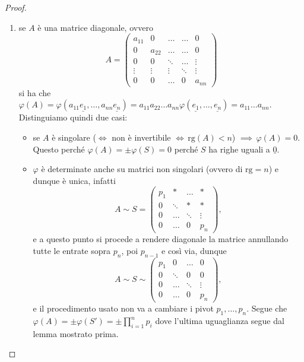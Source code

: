 \begin{proof}
\begin{enumerate}
        \item se $A$ è una matrice diagonale, ovvero
        $$
            A = \begin{pmatrix}
                a_{11} & 0 & \ldots & \ldots & 0 \\
                0 & a_{22} & \ldots & \ldots & 0 \\
                0 & 0 & \ddots & \ldots & \vdots \\
                \vdots & \vdots & \vdots & \ddots & \vdots \\
                0 & 0 & \ldots & 0 & a_{nn}
            \end{pmatrix}
        $$
        si ha che $\varphi(A) = \varphi(a_{11}\underline{e_1}, \ldots, a_{nn}\underline{e_n}) = a_{11} a_{22} \ldots a_{nn} \varphi(\underline{e_1}, \ldots, \underline{e_n}) = a_{11} \ldots a_{nn}.$
        Distinguiamo quindi due casi:
        \begin{itemize}
          \item se $A$ è singolare ($\iff$ non è invertibile $\iff \, \text{rg}(A) < n$) $\implies \, \varphi(A) = 0$. Questo perché $\varphi(A) = \pm \varphi(S) = 0$ perché $S$ ha righe uguali a $\underline{0}$.
          \item $\varphi$ è determinate anche su matrici non singolari (ovvero di $\text{rg} = n$) e dunque è unica, infatti
            $$A \sim S = \begin{pmatrix}
              p_1 & \ast & \ldots  & \ast \\
              0 & \ddots & \ast &  \ast \\
              0 & \ldots & \ddots & \vdots \\
              0 & \ldots & 0 & p_n
            \end{pmatrix},$$
            e a questo punto si procede a rendere diagonale la matrice annullando tutte le entrate sopra $p_n$, poi $p_{n-1}$ e così via, dunque
            $$
            A \sim S \sim \begin{pmatrix}
              p_1 & 0 & \ldots  & 0 \\
              0 & \ddots & 0 &  0 \\
              0 & \ldots & \ddots & \vdots \\
              0 & \ldots & 0 & p_n
            \end{pmatrix},
            $$
            e il procedimento usato non va a cambiare i pivot $p_1, \ldots, p_n$. Segue che $\varphi(A) = \pm \varphi(S') = \pm \prod\limits_{i=1}^n p_i$ dove l'ultima uguaglianza segue dal lemma mostrato prima.

\end{itemize}
\end{enumerate}
\end{proof}
